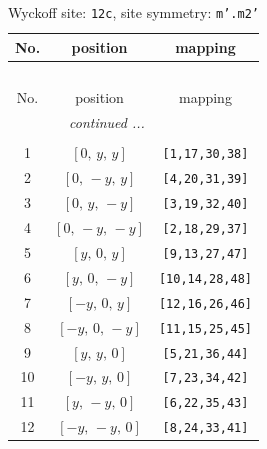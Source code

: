 \documentclass[fleqn,8pt]{jsarticle}
\begin{document}
\begin{longtable}{ccc}
\caption{Wyckoff site: {\tt 12c}, site symmetry: {\tt m'.m2'}}
 \\
 \hline \hline
No. & position & mapping \\ \hline \endfirsthead

\multicolumn{2}{l}{\tablename\ \thetable{}} \\
 \hline \hline
No. & position & mapping \\ \hline \endhead

 \hline \hline
\multicolumn{2}{r}{\footnotesize\it continued ...} \\ \endfoot

 \hline \hline
\multicolumn{2}{r}{} \\ \endlastfoot

1 & $\left[ 0,\, y,\, y \right]$ & {\tt [1,17,30,38]} \\ \hline
2 & $\left[ 0,\, - y,\, y \right]$ & {\tt [4,20,31,39]} \\ \hline
3 & $\left[ 0,\, y,\, - y \right]$ & {\tt [3,19,32,40]} \\ \hline
4 & $\left[ 0,\, - y,\, - y \right]$ & {\tt [2,18,29,37]} \\ \hline
5 & $\left[ y,\, 0,\, y \right]$ & {\tt [9,13,27,47]} \\ \hline
6 & $\left[ y,\, 0,\, - y \right]$ & {\tt [10,14,28,48]} \\ \hline
7 & $\left[ - y,\, 0,\, y \right]$ & {\tt [12,16,26,46]} \\ \hline
8 & $\left[ - y,\, 0,\, - y \right]$ & {\tt [11,15,25,45]} \\ \hline
9 & $\left[ y,\, y,\, 0 \right]$ & {\tt [5,21,36,44]} \\ \hline
10 & $\left[ - y,\, y,\, 0 \right]$ & {\tt [7,23,34,42]} \\ \hline
11 & $\left[ y,\, - y,\, 0 \right]$ & {\tt [6,22,35,43]} \\ \hline
12 & $\left[ - y,\, - y,\, 0 \right]$ & {\tt [8,24,33,41]} \\
\end{longtable}
\renewcommand{\arraystretch}{1.2}
\end{document}
